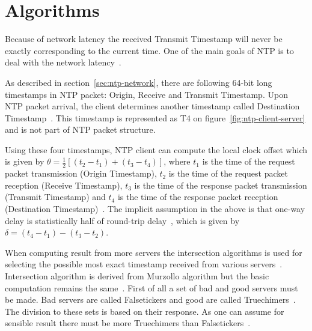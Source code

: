 
\section{Algorithms}\label{sec:ntp-algorithms}
Because of network latency the received Transmit Timestamp will never be exactly
corresponding to the current time.
One of the main goals of NTP is to deal with the network latency~\cite{ntp-overview}.

As described in section~\ref{sec:ntp-network},
there are following 64-bit long timestamps in NTP packet: Origin, Receive and Transmit Timestamp.
Upon NTP packet arrival, the client determines another timestamp called
Destination Timestamp~\cite{rfc5905}.
This timestamp is represented as T4 on figure~\ref{fig:ntp-client-server}
and is not part of NTP packet structure.

Using these four timestamps, NTP client can compute
the local clock offset which is given by $\theta = \frac{1}{2}[(t_2 - t_1) + (t_3 - t_4)]$,
where $t_1$ is the time of the request packet transmission (Origin Timestamp),
$t_2$ is the time of the request packet reception (Receive Timestamp),
$t_3$ is the time of the response packet transmission (Transmit Timestamp) and
$t_4$ is the time of the response packet reception (Destination Timestamp)~\cite{ntp-algor,rfc5905}.
The implicit assumption in the above is that one-way delay is
statistically half of round-trip delay~\cite{rfc5905},
which is given by $\delta = (t_4 - t_1) - (t_3 - t_2)$.

When computing result from more servers the intersection algorithms is used
for selecting the possible most exact timestamp received from various servers~\cite{ntp-algor-article,rfc5905}.
Intersection algorithm is derived from Murzollo algorithm but the basic
computation remains the same~\cite{ntp-history}.
First of all a set of bad and good servers must be made.
Bad servers are called Falsetickers and good are called Truechimers~\cite{rfc5905}.
The division to these sets is based on their response.
As one can assume for sensible result there must be more Truechimers than Falsetickers~\cite{rfc5905}.

